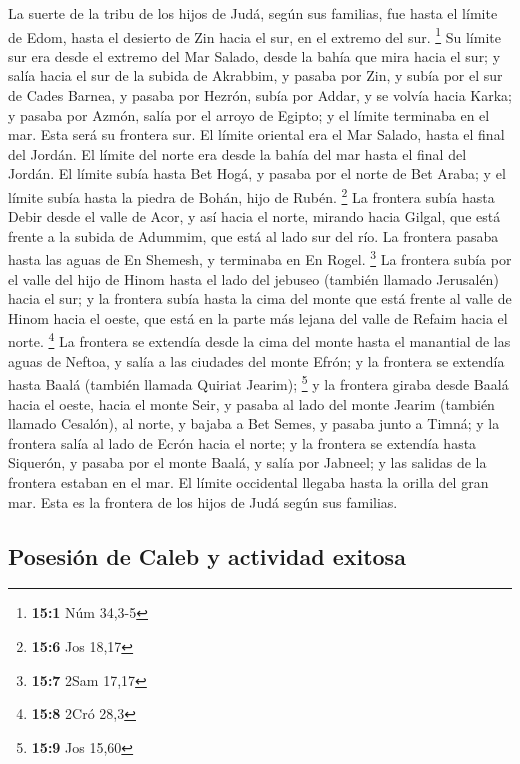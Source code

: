  La suerte de la tribu de los hijos de Judá, según sus
familias, fue hasta el límite de Edom, hasta el desierto de Zin hacia el
sur, en el extremo del sur. \footnote{\textbf{15:1} Núm 34,3-5}
 Su límite sur era desde el extremo del Mar Salado, desde
la bahía que mira hacia el sur;  y salía hacia el sur de
la subida de Akrabbim, y pasaba por Zin, y subía por el sur de Cades
Barnea, y pasaba por Hezrón, subía por Addar, y se volvía hacia Karka;
 y pasaba por Azmón, salía por el arroyo de Egipto; y el
límite terminaba en el mar. Esta será su frontera sur.  El
límite oriental era el Mar Salado, hasta el final del Jordán. El límite
del norte era desde la bahía del mar hasta el final del Jordán.
 El límite subía hasta Bet Hogá, y pasaba por el norte de
Bet Araba; y el límite subía hasta la piedra de Bohán, hijo de Rubén.
\footnote{\textbf{15:6} Jos 18,17}  La frontera subía
hasta Debir desde el valle de Acor, y así hacia el norte, mirando hacia
Gilgal, que está frente a la subida de Adummim, que está al lado sur del
río. La frontera pasaba hasta las aguas de En Shemesh, y terminaba en En
Rogel. \footnote{\textbf{15:7} 2Sam 17,17}  La frontera
subía por el valle del hijo de Hinom hasta el lado del jebuseo (también
llamado Jerusalén) hacia el sur; y la frontera subía hasta la cima del
monte que está frente al valle de Hinom hacia el oeste, que está en la
parte más lejana del valle de Refaim hacia el norte. \footnote{\textbf{15:8}
  2Cró 28,3}  La frontera se extendía desde la cima del
monte hasta el manantial de las aguas de Neftoa, y salía a las ciudades
del monte Efrón; y la frontera se extendía hasta Baalá (también llamada
Quiriat Jearim); \footnote{\textbf{15:9} Jos 15,60}  y la
frontera giraba desde Baalá hacia el oeste, hacia el monte Seir, y
pasaba al lado del monte Jearim (también llamado Cesalón), al norte, y
bajaba a Bet Semes, y pasaba junto a Timná;  y la
frontera salía al lado de Ecrón hacia el norte; y la frontera se
extendía hasta Siquerón, y pasaba por el monte Baalá, y salía por
Jabneel; y las salidas de la frontera estaban en el mar. 
El límite occidental llegaba hasta la orilla del gran mar. Esta es la
frontera de los hijos de Judá según sus familias.

\hypertarget{posesiuxf3n-de-caleb-y-actividad-exitosa}{%
\subsection{Posesión de Caleb y actividad
exitosa}\label{posesiuxf3n-de-caleb-y-actividad-exitosa}}

